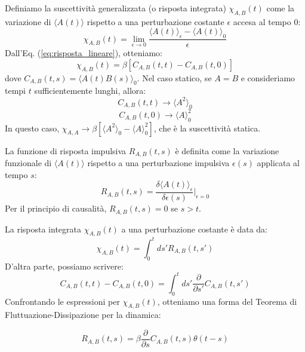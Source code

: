 \noindent Definiamo la suscettività generalizzata (o risposta integrata) $\chi_{A,B}(t)$ come la variazione di $\langle A(t) \rangle$ rispetto a una perturbazione costante $\epsilon$ accesa al tempo $0$:
\begin{equation}
\chi_{A,B}(t)= \lim_{\epsilon\rightarrow0}\frac{\langle A(t)\rangle_{\epsilon}-\langle A(t)\rangle_{0}}{\epsilon}
\end{equation}
Dall'Eq. (\ref{eq:risposta_lineare}), otteniamo:
\begin{equation}
\chi_{A,B}(t)=\beta[C_{A,B}(t,t)-C_{A,B}(t,0)]
\end{equation}
dove $C_{A,B}(t,s) = \langle A(t)B(s)\rangle_{0}$.
Nel caso statico, se $A=B$ e consideriamo tempi $t$ sufficientemente lunghi, allora:
\begin{equation*}
C_{A,B}(t,t) \rightarrow \langle A^2 \rangle_0 
\end{equation*}
\begin{equation*}
C_{A,B}(t,0) \rightarrow \langle A \rangle_0^2
\end{equation*}
In questo caso, $\chi_{A,A} \rightarrow \beta[\langle A^2 \rangle_0 - \langle A \rangle_0^2]$, che è la suscettività statica.

\noindent La funzione di risposta impulsiva $R_{A,B}(t,s)$ è definita come la variazione funzionale di $\langle A(t) \rangle$ rispetto a una perturbazione impulsiva $\epsilon(s)$ applicata al tempo $s$:
\begin{equation}
R_{A,B}(t,s)=\frac{\delta\langle A(t)\rangle_{\epsilon}}{\delta\epsilon(s)}\bigg|_{\epsilon=0}
\end{equation}
Per il principio di causalità, $R_{A,B}(t,s)=0$ se $s>t$.

\noindent La risposta integrata $\chi_{A,B}(t)$ a una perturbazione costante è data da:
\begin{equation}
\chi_{A,B}(t) = \int_{0}^{t}ds' R_{A,B}(t,s')
\end{equation}
D'altra parte, possiamo scrivere:
\begin{equation}
C_{A,B}(t,t)-C_{A,B}(t,0) = \int_0^t ds' \frac{\partial}{\partial s'}C_{A,B}(t,s')
\end{equation}
Confrontando le espressioni per $\chi_{A,B}(t)$, otteniamo una forma del Teorema di Fluttuazione-Dissipazione per la dinamica:

\begin{tcolorbox}[colback=colorA!5, colframe=colorA, arc=3mm, boxrule=1.2pt]
\begin{equation}
R_{A,B}(t,s)=\beta\frac{\partial}{\partial s}C_{A,B}(t,s)\theta(t-s)
\end{equation}
\end{tcolorbox}

